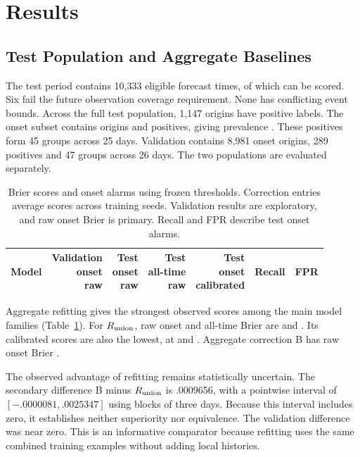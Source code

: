 \documentclass{llncs}
\begin{document}
\section{Results}
\subsection{Test Population and Aggregate Baselines}
The test period contains 10,333 eligible forecast times, of which \TestEligible{} can be scored. Six fail the future observation coverage requirement. None has conflicting event bounds. Across the full test population, 1,147 origins have positive labels. The onset subset contains \TestOnsetN{} origins and \TestPos{} positives, giving prevalence \TestPrevalence{}. These positives form 45 groups across 25 days. Validation contains 8,981 onset origins, 289 positives and 47 groups across 26 days. The two populations are evaluated separately.

\begin{table}[t]
\caption{Brier scores and onset alarms using frozen thresholds. Correction entries average scores across training seeds. Validation results are exploratory, and raw onset Brier is primary. Recall and FPR describe test onset alarms.}
\label{tab:scores}
\centering\small
\begin{tabular*}{\textwidth}{@{\extracolsep{\fill}}lrrrrrr}
\toprule
Model & \shortstack{Validation\\onset\\raw} & \shortstack{Test\\onset\\raw} & \shortstack{Test\\all-time\\raw} & \shortstack{Test\\onset\\calibrated} & Recall & FPR\\
\midrule

\bottomrule
\end{tabular*}
\end{table}

Aggregate refitting gives the strongest observed scores among the main model families (Table~\ref{tab:scores}). For $R_{\rm union}$, raw onset and all-time Brier are \TestOnRUnion{} and \TestAllRUnion{}. Its calibrated scores are also the lowest, at \TestCalOnRUnion{} and \TestCalAllRUnion{}. Aggregate correction B has raw onset Brier \TestOnB{}.

The observed advantage of refitting remains statistically uncertain. The secondary difference B minus $R_{\rm union}$ is .0009656, with a pointwise interval of $[-.0000081,\allowbreak .0025347]$ using blocks of three days. Because this interval includes zero, it establishes neither superiority nor equivalence. The validation difference was near zero. This is an informative comparator because refitting uses the same combined training examples without adding local histories.
\end{document}
